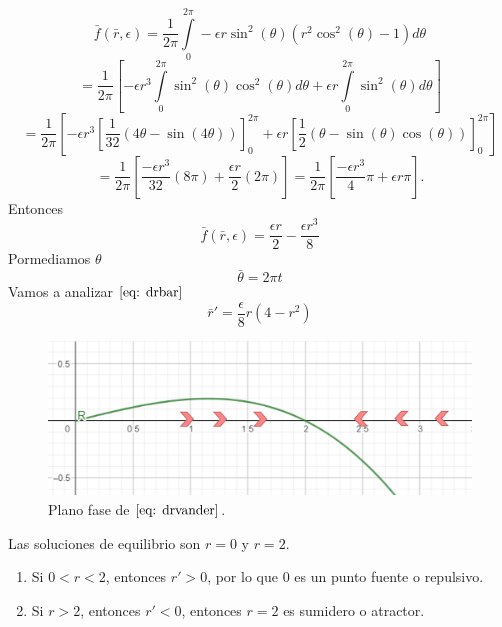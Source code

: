 \documentclass[12pt, a4paper]{report}
\begin{document}
$$\bar{f}(\bar{r},\epsilon)=\frac{1}{2\pi}\int\limits_0^{2\pi}-\epsilon r\sin^2(\theta)(r^2\cos^2(\theta)-1)d\theta$$
$$=\frac{1}{2\pi}[-\epsilon r^3\int\limits_0^{2\pi}\sin^2(\theta)\cos^2(\theta)d\theta+\epsilon r\int\limits_0^{2\pi}\sin^2(\theta)d\theta]$$
$$=\frac{1}{2\pi}[-\epsilon r^3[\frac{1}{32}(4\theta-\sin(4\theta))]_0^{2\pi}+\epsilon r[\frac{1}{2}(\theta-\sin(\theta)\cos(\theta))]_0^{2\pi}]$$
$$=\frac{1}{2\pi}[\frac{-\epsilon r^3}{32}(8\pi)+\frac{\epsilon r}{2}(2\pi)]=\frac{1}{2\pi}[\frac{-\epsilon r^3}{4}\pi+\epsilon r\pi].$$
Entonces
$$\bar{f}(\bar{r},\epsilon)=\frac{\epsilon r}{2}-\frac{\epsilon r^3}{8}$$
Pormediamos $\theta$
$$\bar{\theta}=2\pi t$$
Vamos a analizar $\eqref{eq: drbar}$
\begin{equation}\label{eq: drvander}
	\bar{r}'=\frac{\epsilon}{8}r(4-r^2)
\end{equation}
\begin{figure}[h]
	\centering
	\includegraphics[width=12cm]{graficavanderpol.png}
	\caption{Plano fase de $\eqref{eq: drvander}$.}
\end{figure}
Las soluciones de equilibrio son $r=0$ y $r=2$.
\begin{enumerate}
	\item Si $0<r<2$, entonces $r'>0$, por lo que $0$ es un punto fuente o repulsivo.
	\item Si $r>2$, entonces $r'<0$, entonces $r=2$ es sumidero o atractor.
\end{enumerate}\\
\end{document}
